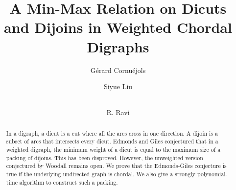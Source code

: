 \documentclass[runningheads]{llncs}
\begin{document}
%
\title{A Min-Max Relation on Dicuts and Dijoins in Weighted Chordal Digraphs}
%

\author{Gérard Cornuéjols \and
Siyue Liu \and \\
R. Ravi}
%

%
%



\maketitle              %
%
\begin{abstract}
In a digraph, a dicut is a cut where all the arcs cross in one direction. A dijoin is a subset of arcs that intersects every dicut. Edmonds and Giles conjectured that in a weighted digraph, the minimum weight of a dicut is equal to the maximum size of a packing of dijoins. This has been disproved. However, the unweighted version conjectured by Woodall remains open. We prove that the Edmonds-Giles conjecture is true if the underlying undirected graph is chordal. We also give a strongly polynomial-time algorithm to construct such a packing.

\end{abstract}
%
%
%
\end{document}
